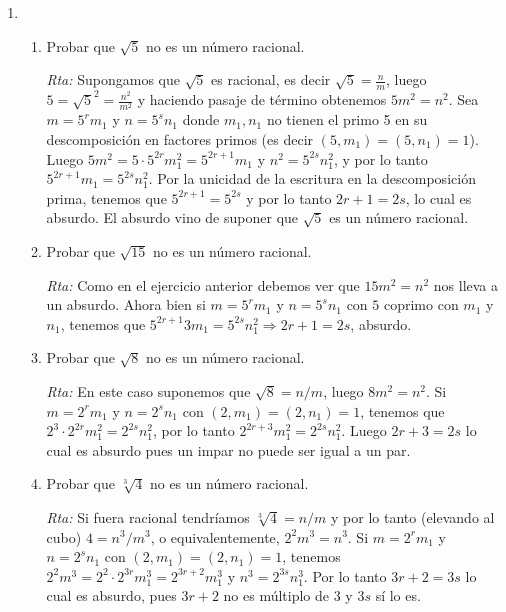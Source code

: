 \documentclass[a4paper,12pt,twoside,spanish,reqno]{amsbook}
\numberwithin{equation}{section}
\newcommand{\rta}{\noindent\textit{Rta: }}
\begin{document}
\begin{enumerate}
 
 
 
 \item 
 \begin{enumerate}
     \item Probar  que $\sqrt{5}$ no es un número racional.     
     
     \rta Supongamos que  $\sqrt{5}$ es racional, es decir $\sqrt{5} = \displaystyle \frac{n}{m}$, luego $5 =\sqrt{5}^2 =\displaystyle \frac{n^2}{m^2}$ y haciendo pasaje de término obtenemos $5m^2 = n^2$. Sea $m = 5^rm_1$ y $n = 5^sn_1$ donde $m_1,n_1$ no tienen el primo 5 en su descomposición en factores primos (es decir $(5,m_1) = (5,n_1) = 1$). Luego $5m^2 = 5 \cdot 5^{2r}m_1^2= 5^{2r+1}m_1$ y $n^2 = 5^{2s}n_1^2$, y por lo tanto $5^{2r+1}m_1 =   5^{2s}n_1^2$. Por la unicidad de la escritura en la descomposición prima,  tenemos que  $5^{2r+1}= 5^{2s}$ y por lo tanto  ${2r+1}= {2s}$, lo cual es absurdo. El absurdo vino de suponer que   $\sqrt{5}$ es un número racional.
     \item Probar  que $\sqrt{15}$ no es un número racional.      
     
     \rta Como en el ejercicio anterior debemos ver que $15m^2 = n^2$ nos lleva a un absurdo. Ahora bien si $m = 5^rm_1$ y $n = 5^sn_1$ con $5$ coprimo con $m_1$ y $n_1$, tenemos que  $5^{2r+1}3m_1 =   5^{2s}n_1^2 \Rightarrow 2r+1 = 2s$, absurdo.
     \item Probar  que $\sqrt{8}$ no es un número racional.     
     
     \rta En  este caso  suponemos que $\sqrt{8} =n/m$, luego $ 8m^2 = n^2$. Si $m = 2^rm_1$ y $n = 2^sn_1$ con $(2,m_1) = (2,n_1) = 1$, tenemos  que $2^3 \cdot 2^{2r} m_1^2 = 2^{2s}n_1^2$, por lo tanto $2^{2r+3} m_1^2 = 2^{2s}n_1^2$. Luego $2r+3 = 2s$ lo cual es absurdo pues un impar no puede ser igual a un par.  
     \item Probar  que $\sqrt[3]{4}$ no es un número racional.     
     
     \rta Si fuera racional tendríamos $\sqrt[3]{4} = n/m$ y  por lo tanto (elevando al cubo) $4 =n^3/m^3$, o equivalentemente,   $2^2m^3 = n^3$. Si $m = 2^rm_1$ y $n = 2^sn_1$ con $(2,m_1) = (2,n_1) = 1$, tenemos  $2^2m^3 = 2^2\cdot 2^{3r}m_1^3 =2^{3r+2}m_1^3$ y      $n^3 =2^{3s}n_1^3 $. Por  lo tanto  $3r+2 = 3s$ lo cual es absurdo, pues $3r+2$ no es múltiplo de 3 y $3s$ sí lo es.
 \end{enumerate}




\end{enumerate}
\end{document}
